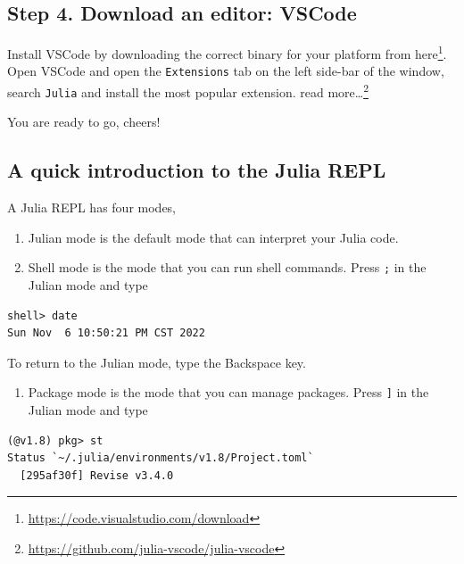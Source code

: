 \documentclass[
  notoc %
]{tufte-book}
\DeclareRobustCommand{\href}[2]{#2\footnote{\url{#1}}}
\providecommand{\tightlist}{%
  \setlength{\itemsep}{0pt}\setlength{\parskip}{0pt}
}
\newcommand{\passthrough}[1]{#1}
\begin{document}
\hypertarget{step-4.-download-an-editor-vscode}{%
\subsection{Step 4. Download an editor:
VSCode}\label{step-4.-download-an-editor-vscode}}

Install VSCode by downloading the correct binary for your platform from
\href{https://code.visualstudio.com/download}{here}. Open VSCode and
open the \passthrough{\lstinline!Extensions!} tab on the left side-bar
of the window, search \passthrough{\lstinline!Julia!} and install the
most popular extension.
\href{https://github.com/julia-vscode/julia-vscode}{read more\ldots{}}

You are ready to go, cheers!

\hypertarget{a-quick-introduction-to-the-julia-repl}{%
\subsection{A quick introduction to the Julia
REPL}\label{a-quick-introduction-to-the-julia-repl}}

A Julia REPL has four modes,

\begin{enumerate}
\def\labelenumi{\arabic{enumi}.}
\item
  Julian mode is the default mode that can interpret your Julia code.
\item
  Shell mode is the mode that you can run shell commands. Press
  \passthrough{\lstinline!;!} in the Julian mode and type
\end{enumerate}

\begin{lstlisting}
shell> date
Sun Nov  6 10:50:21 PM CST 2022
\end{lstlisting}

To return to the Julian mode, type the Backspace key.

\begin{enumerate}
\def\labelenumi{\arabic{enumi}.}
\setcounter{enumi}{2}
\tightlist
\item
  Package mode is the mode that you can manage packages. Press
  \passthrough{\lstinline!]!} in the Julian mode and type
\end{enumerate}

\begin{lstlisting}
(@v1.8) pkg> st
Status `~/.julia/environments/v1.8/Project.toml`
  [295af30f] Revise v3.4.0
\end{lstlisting}
\end{document}
